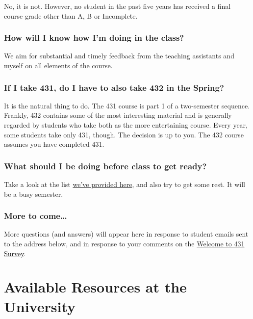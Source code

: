 \documentclass[
]{book}
\begin{document}
No, it is not. However, no student in the past five years has received a final course grade other than A, B or Incomplete.

\hypertarget{how-will-i-know-how-im-doing-in-the-class}{%
\subsection{How will I know how I'm doing in the class?}\label{how-will-i-know-how-im-doing-in-the-class}}

We aim for substantial and timely feedback from the teaching assistants and myself on all elements of the course.

\hypertarget{if-i-take-431-do-i-have-to-also-take-432-in-the-spring}{%
\subsection{If I take 431, do I have to also take 432 in the Spring?}\label{if-i-take-431-do-i-have-to-also-take-432-in-the-spring}}

It is the natural thing to do. The 431 course is part 1 of a two-semester sequence. Frankly, 432 contains some of the most interesting material and is generally regarded by students who take both as the more entertaining course. Every year, some students take only 431, though. The decision is up to you. The 432 course assumes you have completed 431.

\hypertarget{what-should-i-be-doing-before-class-to-get-ready}{%
\subsection{What should I be doing before class to get ready?}\label{what-should-i-be-doing-before-class-to-get-ready}}

Take a look at the list \href{index.html}{we've provided here}, and also try to get some rest. It will be a busy semester.

\hypertarget{more-to-come}{%
\subsection{More to come\ldots{}}\label{more-to-come}}

More questions (and answers) will appear here in response to student emails sent to the address below, and in response to your comments on the \href{https://bit.ly/431-2020-welcome-survey}{Welcome to 431 Survey}.

\hypertarget{available-resources-at-the-university}{%
\chapter{Available Resources at the University}\label{available-resources-at-the-university}}
\end{document}
